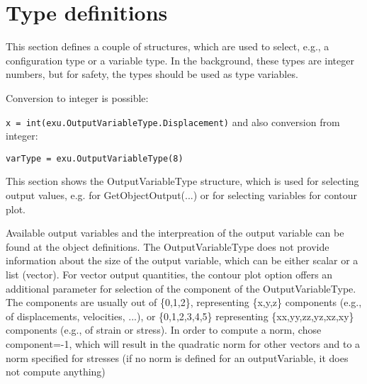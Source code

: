 \section{Type definitions}
This section defines a couple of structures, which are used to select, e.g., a configuration type or a variable type. In the background, these types are integer numbers, but for safety, the types should be used as type variables. 

Conversion to integer is possible: 
 \bi 
 \item[] \texttt{x = int(exu.OutputVariableType.Displacement)} 
\ei and also conversion from integer: 
 \bi 
 \item[] \texttt{varType = exu.OutputVariableType(8)}
 \ei

\label{sec:OutputVariableType}
This section shows the OutputVariableType structure, which is used for selecting output values, e.g. for GetObjectOutput(...) or for selecting variables for contour plot.

Available output variables and the interpreation of the output variable can be found at the object definitions. 
 The OutputVariableType does not provide information about the size of the output variable, which can be either scalar or a list (vector). For vector output quantities, the contour plot option offers an additional parameter for selection of the component of the OutputVariableType. The components are usually out of \{0,1,2\}, representing \{x,y,z\} components (e.g., of displacements, velocities, ...), or \{0,1,2,3,4,5\} representing \{xx,yy,zz,yz,xz,xy\} components (e.g., of strain or stress). In order to compute a norm, chose component=-1, which will result in the quadratic norm for other vectors and to a norm specified for stresses (if no norm is defined for an outputVariable, it does not compute anything)


